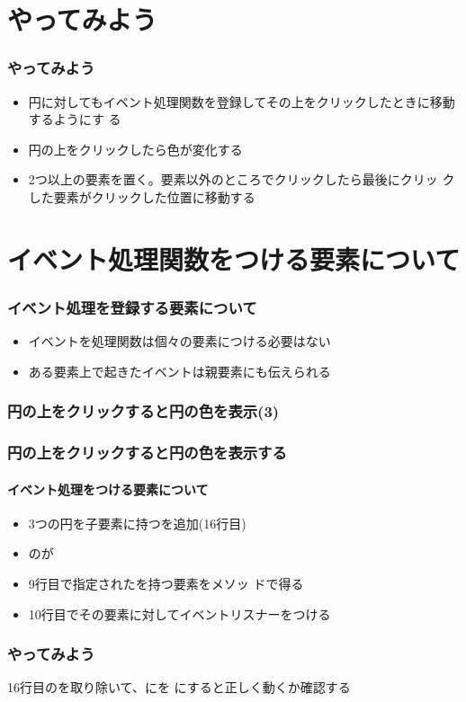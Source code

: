 \section{やってみよう}
\begin{frame}[containsverbatim]
 \frametitle{やってみよう}
 \begin{itemize}
  \item 円に対してもイベント処理関数を登録してその上をクリックしたときに移動するようにす
        る
  \item 円の上をクリックしたら色が変化する
  \item 2つ以上の要素を置く。要素以外のところでクリックしたら最後にクリッ
        クした要素がクリックした位置に移動する
 \end{itemize}
\section{イベント処理関数をつける要素について}
\begin{frame}[containsverbatim]
 \frametitle{イベント処理を登録する要素について}
\begin{itemize}
 \item イベントを処理関数は個々の要素につける必要はない
 \item ある要素上で起きたイベントは親要素にも伝えられる
\end{itemize}
\end{frame}
\begin{frame}[containsverbatim]
 \frametitle{円の上をクリックすると円の色を表示(3)%
 }
\end{frame}
\begin{frame}[containsverbatim]
 \frametitle{円の上をクリックすると円の色を表示する}
 \framesubtitle{イベント処理をつける要素について}
\begin{itemize}
 \item 3つの円を子要素に持つを追加(16行目)
 \item {}のが
 \item 9行目で指定されたを持つ要素をメソッ
       ドで得る
 \item 10行目でその要素に対してイベントリスナーをつける
\end{itemize}
\end{frame}
\begin{frame}[containsverbatim]
 \frametitle{やってみよう}
 16行目のを取り除いて、にを
				にすると正しく動くか確認する
\end{frame}

\end{frame}
